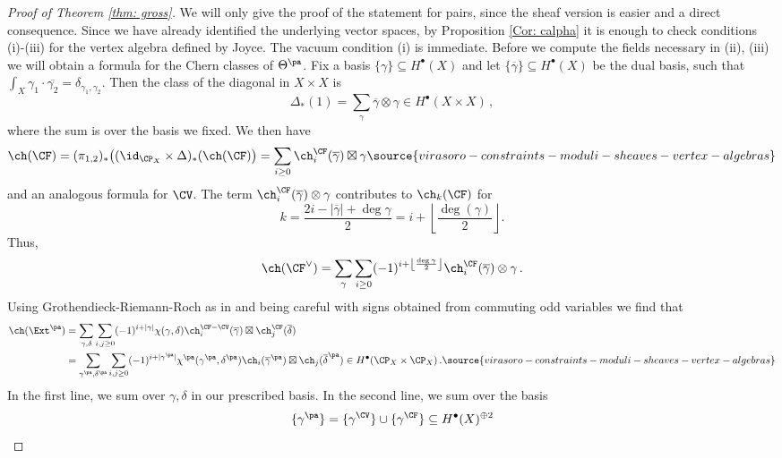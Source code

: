 \begin{proof}[Proof of Theorem \ref{thm: gross}]
We will only give the proof of the statement for pairs, since the sheaf version is easier and a direct consequence. Since we have already identified the underlying vector spaces, by Proposition \ref{Cor: calpha} it is enough to check conditions (i)-(iii) for the vertex algebra defined by Joyce. The vacuum condition (i) is immediate. Before we compute the fields necessary in (ii), (iii) we will obtain a formula for the Chern classes of $\Theta^{\pa}$. Fix a basis $\{\gamma\}\subseteq H^\bullet(X)$ and let $\{ \overline{\gamma}\}\subseteq H^\bullet(X)$ be the dual basis, such that $\int_X \gamma_1\cdot\overline{\gamma_2}=\delta_{\gamma_1,\gamma_2}$. Then the class of the diagonal in $X\times X$ is
\[\Delta_\ast(1)=\sum_{\gamma}\overline\gamma\otimes \gamma\in H^\bullet(X\times X)\,,\]
where the sum is over the basis we fixed. We then have
\begin{equation}\label{eq: chkunnethdescendents}\ch(\CF)  = (\pi_{1,2})_\ast\big((\id_{\CP_X}\times \Delta)_* (\ch(\CF)\big) = \sum_{i\geq 0}\ch^{\CF}_i(\overline{\gamma})\boxtimes\gamma
\source{virasoro-constraints-moduli-sheaves-vertex-algebras}
\end{equation}
and an analogous formula for $\CV$. The term $\ch_{i}^\CF(\overline{\gamma})\otimes \gamma$ contributes to $\ch_k(\CF)$ for \[k=\frac{2i-|\overline \gamma|+\deg \gamma}{2}=i+\left\lfloor\frac{\deg(\gamma)}{2}\right \rfloor.\]
Thus,
\[\ch(\CF^\vee)=\sum_{\gamma}\sum_{i\geq 0} (-1)^{i+\left\lfloor\frac{\deg \gamma}{2}\right \rfloor}\ch_{i}^\CF(\overline{\gamma})\otimes \gamma\,.\]
 Using Grothendieck-Riemann-Roch as in \cite[Proposition 5.2]{Gr19} and being careful with signs obtained from commuting odd variables we find that
\begin{align}\nonumber
\ch(\Ext^{\pa}) &=\sum_{\gamma, \delta}\sum_{i, j\geq 0}(-1)^{i+|\gamma|}\chi(\gamma, \delta)\ch_i^{\CF-\CV}(\overline \gamma)\boxtimes\ch_j^{\CF}(\overline \delta)\\
&=\sum_{\gamma^{\pa}, \delta^{\pa}}\sum_{i, j\geq 0}(-1)^{i+|\gamma^{\pa}|}\chi^{\pa}(\gamma^{\pa}, \delta^{\pa})\ch_i(\overline \gamma^{\pa})\boxtimes\ch_j(\overline \delta^{\pa})\in H^\bullet(\CP_X\times \CP_X)\,.\label{eq: chextpa}
\source{virasoro-constraints-moduli-sheaves-vertex-algebras}
\end{align}
In the first line, we sum over $\gamma, \delta$ in our prescribed basis. In the second line, we sum over the basis
\[\{\gamma^{\pa}\}=\{\gamma^\CV\}\cup \{\gamma^\CF\}\subseteq H^\bullet(X)^{\oplus 2}\]

\end{proof}
